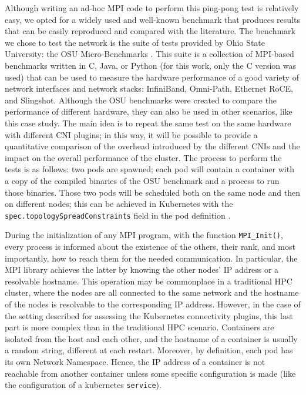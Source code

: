 Although writing an ad-hoc MPI code to perform this ping-pong test is relatively
easy, we opted for a widely used and well-known benchmark that produces results
that can be easily reproduced and compared with the literature.
The benchmark we chose to test the network is the suite of tests provided by
Ohio State University: the OSU Micro-Benchmarks \cite{osu}.
This suite is a collection of MPI-based benchmarks written in C, Java, or Python
(for this work, only the C version was used) that can be used to measure the
hardware performance of a good variety of network interfaces and network stacks:
InfiniBand, Omni-Path, Ethernet RoCE, and Slingshot.
Although the OSU benchmarks were created to compare the performance of different
hardware, they can also be used in other scenarios, like this case study.
The main idea is to repeat the same test on the same hardware with different CNI
plugins; in this way, it will be possible to provide a quantitative comparison
of the overhead introduced by the different CNIs and the impact on the overall
performance of the cluster.
The process to perform the tests is as follows: two pods are spawned; each pod
will contain a container with a copy of the compiled binaries of the OSU
benchmark and a process to run those binaries.
Those two pods will be scheduled both on the same node and then on different
nodes; this can be achieved in Kubernetes with the
\texttt{spec.topologySpreadConstraints} field in the pod definition
\cite{kdoc-topologyconstraints}.

During the initialization of any MPI program, with the function
\texttt{MPI\_Init()}, every process is informed about the existence of the
others, their rank, and most importantly, how to reach them for the needed
communication.
In particular, the MPI library achieves the latter by knowing the other nodes'
IP address or a resolvable hostname.
This operation may be commonplace in a traditional HPC cluster, where the nodes
are all connected to the same network and the hostname of the nodes is
resolvable to the corresponding IP address.
However, in the case of the setting described for assessing the Kubernetes
connectivity plugins, this last part is more complex than in the traditional HPC
scenario.
Containers are isolated from the host and each other, and the hostname of a
container is usually a random string, different at each restart.
Moreover, by definition, each pod has its own Network Namespace.
Hence, the IP address of a container is not reachable from another container
unless some specific configuration is made (like the configuration of a
kubernetes \texttt{service}).

